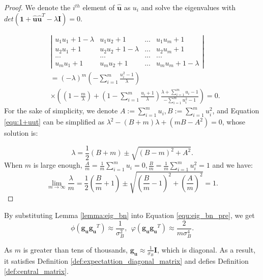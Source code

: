\documentclass[10pt,journal,compsoc]{IEEEtran}
\begin{document}
\begin{proof}
We denote the $i^{th}$ element of $\hat{\mathbf{u}}$ as $u_i$ and solve the eigenvalues with $det(\mathbf{1}+\hat{\mathbf{u}}\hat{\mathbf{u}}^T-\lambda \mathbf{I})=0$.

\begin{equation}
\begin{split}
&{\left|\begin{array}{cccc} 
    u_1u_1+1-\lambda &    u_1u_2+1    & ... &u_1u_m+1 \\ 
    u_2u_1+1 &    u_2u_2+1 - \lambda    & ... &u_2u_m+1 \\
    ... & ... & ...&...\\
    u_mu_1+1 &    u_mu_2+1    & ... &u_mu_m+1-\lambda
\end{array}\right|}\\
&=(-\lambda)^m\left(-\sum_{i=1}^m\frac{u_i^2-1}{\lambda}\right)\\
& \times \left(\left(1-\frac{m}{\lambda}\right)\!+\!\left(1-\sum_{i=1}^m\frac{u_i+1}{\lambda}\right)\frac{\lambda+\sum_{i=1}^mu_i-1}{-\sum_{i=1}^mu_i^2-1}\right)=0.
\end{split}
\label{equ:1+uut}
\end{equation}
For the sake of simplicity, we denote $A:=\sum_{i=1}^mu_i,B:=\sum_{i=1}^mu_i^2$, and Equation \eqref{equ:1+uut} can be simplified as $\lambda^2 - (B+m)\lambda + (mB-A^2)=0$, whose solution is:

\begin{equation}
    \lambda = \frac{1}{2}(B+m)\pm \sqrt{(B-m)^2+A^2}.
\end{equation}
When $m$ is large enough, $\frac{A}{m}=\frac{1}{m}\sum_{i=1}^mu_i=0,\frac{B}{m}=\frac{1}{m}\sum_{i=1}^mu_i^2=1$ and we have:
\begin{equation}
    \lim_{m\rightarrow \infty}\frac{\lambda}{m} = \frac{1}{2}\left(\frac{B}{m}+1\right)\pm \sqrt{\left(\frac{B}{m}-1\right)^2+\left(\frac{A}{m}\right)^2}=1.
\end{equation}
\end{proof}

By substituting Lemma \ref{lemma:eig_bn} into Equation \eqref{equ:eig_bn_pre}, we get
\begin{equation}
    \phi(\mathbf{g_ug_u}^T) \approx \frac{1}{\sigma_B^2},~~\varphi(\mathbf{g_ug_u}^T) \approx \frac{2}{m\sigma_B^4}.
\label{equ:eig_bn}
\end{equation}

As $m$ is greater than tens of thousands, $\mathbf{g_u}\approx\frac{1}{\sigma_B}\mathbf{I}$, which is diagonal. As a result, it satisfies Definition \ref{def:expectattion_diagonal_matrix} and defies Definition \ref{def:central_matrix}.
 
\end{document}

